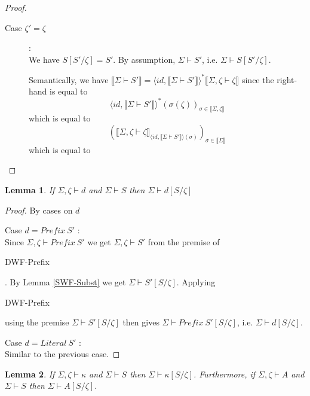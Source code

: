 \documentclass{article}
\newtheorem{lemma}{Lemma}
\newcommand{\sem}[1]{\llbracket #1 \rrbracket}
\begin{document}
\begin{proof}
\begin{description}
\begin{description}
\item[Case $\zeta' = \zeta$]:\\
We have $S[S'/\zeta] = S'$. By assumption, $\Sigma \vdash S'$, i.e. $\Sigma \vdash S[S'/\zeta]$.

Semantically, we have $\sem{\Sigma \vdash S'} = \langle \mathit{id}, \sem{\Sigma \vdash S'} \rangle^* \sem{\Sigma,\zeta \vdash \zeta}$ since the right-hand is equal to $$\langle \mathit{id}, \sem{\Sigma \vdash S'} \rangle^* (\sigma(\zeta))_{\sigma \in \sem{\Sigma,\zeta}}$$
which is equal to
$$( \sem{\Sigma,\zeta \vdash \zeta}_{\langle \mathit{id}, \sem{\Sigma \vdash S'} \rangle(\sigma)} )_{\sigma \in \sem{\Sigma}}$$
which is equal to
$$ $$
\end{description}

\end{description}

\end{proof}

\begin{lemma}
If $\Sigma,\zeta \vdash d$ and $\Sigma \vdash S$ then $\Sigma \vdash d[S/\zeta]$
\label{DWF-Subst}
\end{lemma}

\begin{proof}
By cases on $d$

\item[Case $d = \mathit{Prefix}~S'$]:\\
Since $\Sigma,\zeta \vdash \mathit{Prefix}~S'$ we get $\Sigma,\zeta \vdash S'$ from the premise of 
\begin{sc}DWF-Prefix\end{sc}. By Lemma \ref{SWF-Subst} we get $\Sigma \vdash S'[S/\zeta]$. Applying
\begin{sc}DWF-Prefix\end{sc} using the premise $\Sigma \vdash S'[S/\zeta]$ then gives $\Sigma \vdash \mathit{Prefix}~S'[S/\zeta]$, i.e. $\Sigma \vdash d[S/\zeta]$.

\item[Case $d = \mathit{Literal}~S'$]:\\
Similar to the previous case.

\end{proof}

\begin{lemma}
If $\Sigma,\zeta \vdash \kappa$ and $\Sigma \vdash S$ then $\Sigma \vdash \kappa[S/\zeta]$.
Furthermore, if $\Sigma,\zeta \vdash A$ and $\Sigma \vdash S$ then $\Sigma \vdash A[S/\zeta]$.
\end{lemma}
\end{document}
